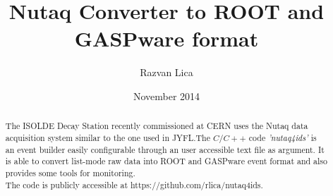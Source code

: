 \documentclass{article}
\author{Razvan Lica}
\title{Nutaq Converter to ROOT and GASPware format}
\date{November 2014}
\begin{document}
\maketitle
\begin{abstract}
\noindent The ISOLDE Decay Station recently commissioned at CERN uses the Nutaq data acquisition system similar to the one used in JYFL.The $C/C++$ code \emph{'nutaq4ids'} is an event builder easily configurable through an user accessible text file as argument. It is able to convert  list-mode raw data into ROOT and GASPware event format and also provides some tools for monitoring. \\

\noindent The code is publicly accessible at https://github.com/rlica/nutaq4ids.
\end{abstract}
\newpage

\tableofcontents
\newpage


\end{document}
